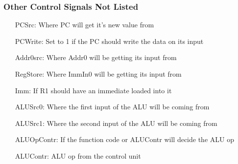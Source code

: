 \documentclass{article}
\begin{document}
		\subsubsection{Other Control Signals Not Listed}
			\begin{itemize}
				\item[PCSrc:] Where PC will get it's new value from
				\item[PCWrite:] Set to 1 if the PC should write the data on its input
				\item[Addr0src:] Where Addr0 will be getting its input from
				\item[RegStore:] Where ImmIn0 will be getting its input from
				\item[Imm:] If R1 should have an immediate loaded into it
				\item[ALUSrc0:] Where the first input of the ALU will be coming from
				\item[ALUSrc1:] Where the second input of the ALU will be coming from
				\item[ALUOpContr:] If the function code or ALUContr will decide the ALU op
				\item[ALUContr:] ALU op from the control unit
			\end{itemize}
\end{document}

